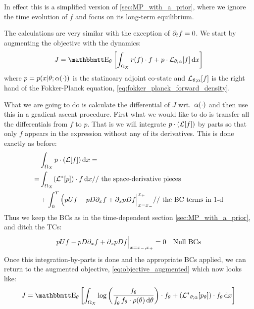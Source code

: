 \documentclass{article}
\begin{document}
In effect this is a simplified version of \cref{sec:MP_with_a_prior}, where we
ignore the time evolution of $f$ and focus on its long-term equilibrium.

The calculations are very similar with the exception of ${\partial}_t f = 0$. We start
by augmenting the objective with the dynamics:
\begin{equation}
J =  \Exp_\th
\left[ \int_{\O_X} r(f) \cdot f + p \cdot \L_{\th;\a}[f]
\intd{x}\right] 
\label{eq:objective_stat_augmented}
\end{equation} 
where $p =  p(x|{\theta}; {\alpha}(\cdot))$ is the statinoary adjoint co-state and 
${ \mathcal{L} }_{{\theta};{\alpha}}[f]$ is the right hand of the Fokker-Planck equation,
\cref{eq:fokker_planck_forward_density}.

What we are going to do is calculate the differential of $J$ wrt.\ ${\alpha}(\cdot)$
and then use this in a gradient ascent procedure. First what we would like to do
is transfer all the differentials from $f$ to $p$. That is we will integrate $p
\cdot ({ \mathcal{L} }[f])$ by parts so that only $f$ appears in the expression
without any of its derivatives. This is done exactly as before:
\begin{align*}
& \int_{{\Omega}_X} p \cdot ({ \mathcal{L} }[f]) \, \mathrm{d} x=
\\
=& \int_{{\Omega}_X}
	    ({ { \mathcal{L} }^* }[p])\cdot f 
	 \, \mathrm{d} x  \textrm{// the space-derivative pieces }
	  \\
	  &+ \int_0^T 
	   \Big( p U f - p D {\partial}_xf + {\partial}_x p D f \Big|_{x={ x_{-} }}^{{ x_{+} }} 
	   \textrm{// the BC terms in 1-d}
\end{align*}
Thus we keep the BCs as in the time-dependent section
\cref{sec:MP_with_a_prior}, and ditch the TCs:
\begin{align*}
p U f - p D {\partial}_xf + {\partial}_x p D f &\Big|_{x={ x_{-} }, { x_{+} }} = 0 & \textrm{Null BCs}
\end{align*}
Once this integration-by-parts is done and the appropriate BCs applied, we
can return to the augmented objective, \cref{eq:objective_augmented} which now
looks like:
\begin{equation}
J =  \Exp_\th
\left[ \int_{\O_X} \log\left(\frac{f_\th}
 					{\int_\th f_\th \cdot \rho(\th)\intd{\th}}\right) 
 			 \cdot f_\th 
 			 + 
 			 (\Lstar_{\th;\a}[p_\th] ) \cdot f_\th
\intd{x}
\right]
\label{eq:objective_stat_augmented_adjoined}
\end{equation}
\end{document}
